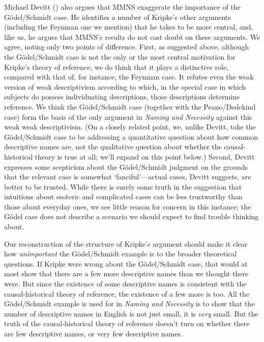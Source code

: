 \documentclass[
  11pt,
  letterpaper,
  DIV=11,
  numbers=noendperiod,
  twoside]{scrartcl}
\begin{document}
Michael Devitt () also argues that MMNS
exaggerate the importance of the Gödel/Schmidt case. He identifies a
number of Kripke's other arguments (including the Feynman one we
mention) that he takes to be more central, and, like us, he argues that
MMNS's results do not cast doubt on these arguments. We agree, noting
only two points of difference. First, as suggested above, although the
Gödel/Schmidt case is not the only or the most central motivation for
Kripke's theory of reference, we do think that it plays a distinctive
role, compared with that of, for instance, the Feynman case. It refutes
even the weak version of weak descriptivism according to which, in the
special case in which subjects do possess individuating descriptions,
those descriptions determine reference. We think the Gödel/Schmidt case
(together with the Peano/Dedekind case) form the basis of the only
argument in \emph{Naming and Necessity} against this weak weak
descriptivism. (On a closely related point, we, unlike Devitt, take the
Gödel/Schmidt case to be addressing a quantitative question about how
common descriptive names are, not the qualitative question about whether
the causal-historical theory is true at all; we'll expand on this point
below.) Second, Devitt expresses some scepticism about the Gödel/Schmidt
judgment on the grounds that the relevant case is somewhat
`fanciful'---actual cases, Devitt suggests, are better to be trusted.
While there is surely some truth in the suggestion that intuitions about
esoteric and complicated cases can be less trustworthy than those about
everyday ones, we see little reason for concern in this instance; the
Gödel case does not describe a scenario we should expect to find trouble
thinking about.

Our reconstruction of the structure of Kripke's argument should make it
clear how \emph{unimportant} the Gödel/Schmidt example is to the broader
theoretical questions. If Kripke were wrong about the Gödel/Schmidt
case, that would at most show that there are a few more descriptive
names than we thought there were. But since the existence of some
descriptive names is consistent with the causal-historical theory of
reference, the existence of a few more is too. All the Gödel/Schmidt
example is used for in \emph{Naming and Necessity} is to show that the
number of descriptive names in English is not just small, it is
\emph{very} small. But the truth of the causal-historical theory of
reference doesn't turn on whether there are few descriptive names, or
very few descriptive names.
\end{document}
